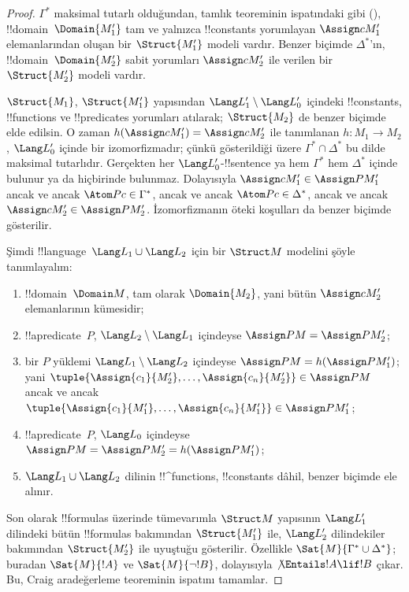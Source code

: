 \documentclass[../../../include/open-logic-section]{subfiles}
\begin{document}
\begin{proof}
$\Gamma^*$ maksimal tutarlı olduğundan, tamlık teoreminin ispatındaki
gibi (), !!{domain}~$\Domain{M'_1}$
tam ve yalnızca !!{constant}s yorumlayan $\Assign c{M'_1}$
elemanlarından oluşan bir $\Struct{M'_1}$ modeli vardır. Benzer biçimde
$\Delta^*$'ın, !!{domain}~$\Domain{M'_2}$ sabit yorumları
$\Assign c{M'_2}$ ile verilen bir $\Struct{M'_2}$ modeli vardır.

$\Struct{M_1}$, $\Struct{M'_1}$ yapısından
$\Lang L'_1\setminus\Lang L'_0$ içindeki !!{constant}s, !!{function}s
ve !!{predicate}s yorumları atılarak; $\Struct{M_2}$ de benzer biçimde
elde edilsin. O zaman
$h(\Assign c{M'_1})=\Assign c{M'_2}$ ile tanımlanan
$h\colon M_1\to M_2$, $\Lang L'_0$ içinde bir izomorfizmadır; çünkü
gösterildiği üzere $\Gamma^*\cap\Delta^*$ bu dilde maksimal tutarlıdır.
Gerçekten her $\Lang L'_0$-!!{sentence} ya hem $\Gamma^*$ hem
$\Delta^*$ içinde bulunur ya da hiçbirinde bulunmaz. Dolayısıyla
$\Assign c{M'_1}\in\Assign P{M'_1}$ ancak ve ancak
$\Atom P c\in\Gamma^*$, ancak ve ancak $\Atom P c\in\Delta^*$, ancak
ve ancak $\Assign c{M'_2}\in\Assign P{M'_2}$. İzomorfizmanın öteki
koşulları da benzer biçimde gösterilir.

Şimdi !!{language}~$\Lang L_1\cup\Lang L_2$ için bir $\Struct M$
modelini şöyle tanımlayalım:
\begin{enumerate}
\item !!{domain}~$\Domain M$, tam olarak $\Domain{M_2}$, yani bütün
  $\Assign c{M'_2}$ elemanlarının kümesidir;
\item !!a{predicate}~$P$, $\Lang L_2\setminus\Lang L_1$ içindeyse
  $\Assign P M=\Assign P{M'_2}$;
\item bir $P$ yüklemi $\Lang L_1\setminus\Lang L_2$ içindeyse
  $\Assign P M=h(\Assign P{M'_1})$; yani
  $\tuple{\Assign{c_1}{M'_2},\dots,\Assign{c_n}{M'_2}}\in\Assign P M$
  ancak ve ancak
  $\tuple{\Assign{c_1}{M'_1},\dots,\Assign{c_n}{M'_1}}\in\Assign P{M'_1}$;
\item !!a{predicate}~$P$, $\Lang L_0$ içindeyse
  $\Assign P M=\Assign P{M'_2}=h(\Assign P{M'_1})$;
\item $\Lang L_1\cup\Lang L_2$ dilinin !!^{function}s, !!{constant}s
  dâhil, benzer biçimde ele alınır.
\end{enumerate}

Son olarak !!{formula}s üzerinde tümevarımla $\Struct M$ yapısının
$\Lang L'_1$ dilindeki bütün !!{formula}s bakımından $\Struct{M'_1}$
ile, $\Lang L'_2$ dilindekiler bakımından $\Struct{M'_2}$ ile
uyuştuğu gösterilir. Özellikle
$\Sat{M}{\Gamma^*\cup\Delta^*}$; buradan $\Sat{M}{!A}$ ve
$\Sat{M}{\lnot !B}$, dolayısıyla $\not\Entails !A\lif !B$ çıkar.
Bu, Craig aradeğerleme teoreminin ispatını tamamlar.
\end{proof}
\end{document}

